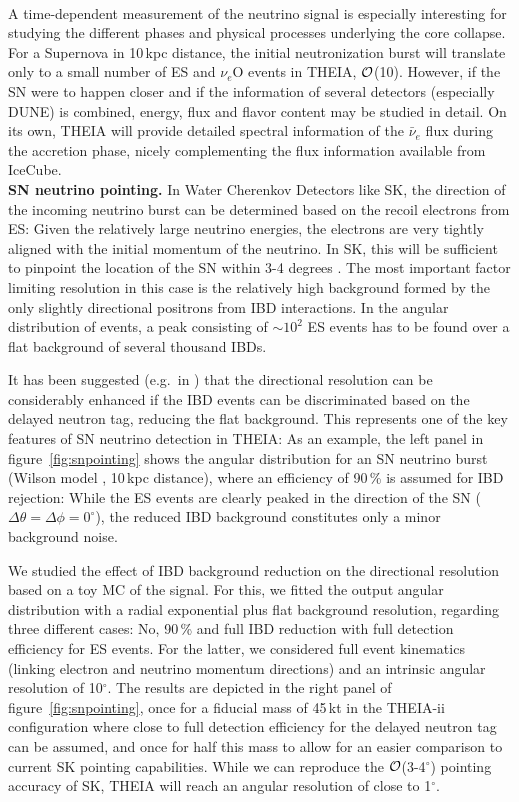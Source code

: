 \medskip\\
 A time-dependent measurement of the neutrino signal is especially interesting for studying the different phases and physical processes underlying the core collapse. For a Supernova in 10\,kpc distance, the initial neutronization burst will translate only to a small number of ES and $\nu_e$O events in THEIA, $\cal O$(10). However, if the SN were to happen closer and if the information of several detectors (especially DUNE) is combined, energy, flux and flavor content may be studied in detail. On its own, THEIA will provide detailed spectral information of the $\bar\nu_e$ flux during the accretion phase, nicely complementing the flux information available from IceCube. 
\medskip\\
{\bf SN neutrino pointing.} In Water Cherenkov Detectors like SK, the direction of the incoming neutrino burst can be determined based on the recoil electrons from ES: Given the relatively large neutrino energies, the electrons are very tightly aligned with the initial momentum of the neutrino. In SK, this will be sufficient to pinpoint the location of the SN within 3-4 degrees \cite{Abe:2016waf}. The most important factor limiting resolution in this case is the relatively high background formed by the only slightly directional positrons from IBD interactions. In the angular distribution of events, a peak consisting of $\sim10^2$ ES events has to be found over a flat background of several thousand IBDs.

It has been suggested (e.g.~in \cite{Tomas:2003xn}) that the directional resolution can be considerably enhanced if the IBD events can be discriminated based on the delayed neutron tag, reducing the flat background. This represents one of the key features of SN neutrino detection in THEIA: As an example, the left panel in figure~\ref{fig:snpointing} shows the angular distribution for an SN neutrino burst (Wilson model \cite{Totani:1997vj}, 10\,kpc distance), where an efficiency of 90\,\% is assumed for IBD rejection: While the ES events are clearly peaked in the direction of the SN ($\Delta\theta=\Delta\phi=0^\circ$), the reduced IBD background constitutes only a minor background noise. 

We studied the effect of IBD background reduction on the directional resolution based on a toy MC of the signal. For this, we fitted the output angular distribution with a radial exponential plus flat background resolution, regarding three different cases: No, 90\,\% and full IBD reduction with full detection efficiency for ES events. For the latter, we considered full event kinematics (linking electron and neutrino momentum directions) and an intrinsic angular resolution of 10$^\circ$. The results are depicted in the right panel of figure~\ref{fig:snpointing}, once for a fiducial mass of 45\,kt in the THEIA-ii configuration where close to full detection efficiency for the delayed neutron tag can be assumed, and once for half this  mass to allow for an easier comparison to current SK pointing capabilities. While we can reproduce the $\cal O$(3-4$^\circ$) pointing accuracy of SK, THEIA will reach an angular resolution of close to 1$^{\circ}$.

